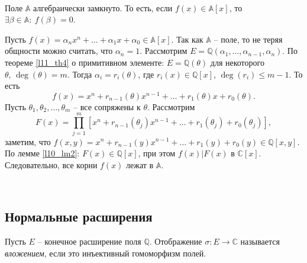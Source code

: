 \begin{theorem} \label{l12_th5}~\\
	Поле $\mathbb{A}$ алгебраически замкнуто. То есть, если $f(x) \in \mathbb{A}[x]$, то $\exists \beta \in \mathbb{A}: \ f(\beta) = 0$.
\end{theorem}
\begin{pf}
	Пусть $f(x) = \alpha_nx^n + \dots + \alpha_1x + \alpha_0 \in \mathbb{A}[x]$. Так как $\mathbb{A}$ -- поле, то не теряя общности можно считать, что $\alpha_n = 1$. Рассмотрим $E = \mathbb{Q}\left( \alpha_1, \dots, \alpha_{n-1}, \alpha_n \right)$. По теореме \ref{l11_th4} о примитивном элементе: $E = \mathbb{Q}(\theta)$ для некоторого $\theta, \, \deg(\theta)=m$. Тогда $\alpha_i = r_i(\theta)$, где $r_i(x) \in \mathbb{Q}[x], \, \deg(r_i) \leq m-1$. То есть
	$$f(x) = x^n + r_{n-1}(\theta) x^{n-1} + \dots + r_1(\theta)x + r_0(\theta).$$
	Пусть $\theta_1, \theta_2, \dots, \theta_m$ -- все сопряжены к $\theta$. Рассмотрим
	$$F(x) = \prod\limits_{j=1}^m \left[ x^n + r_{n-1}(\theta_j)x^{n-1} + \dots + r_1(\theta_j) + r_0(\theta_j) \right],$$
	заметим, что $f(x,y) = x^n + r_{n-1}(y)x^{n-1} + \dots + r_1(y) + r_0(y) \in \mathbb{Q}[x,y]$. По лемме \ref{l10_lm2}: 
	$F(x) \in \mathbb{Q}[x]$, при этом $f(x) \vert F(x)$ в $\mathbb{C}[x]$. 
	Следовательно, все корни $f(x)$ лежат в $\mathbb{A}$.
\end{pf}~\\

\subsection{Нормальные расширения}
\begin{definition}
	Пусть $E$ -- конечное расширение поля $\mathbb{Q}$. Отображение $\sigma\colon E \to \mathbb{C}$ называется \textit{вложением}, если это инъективный гомоморфизм полей.
\end{definition}

